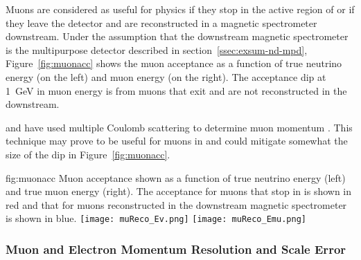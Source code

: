 \label{sec:muacc}

Muons are considered as useful for physics if they stop in the active region of  or if they leave the  detector and are reconstructed in a magnetic spectrometer downstream.  Under the assumption that the downstream magnetic spectrometer is the multipurpose detector described in section~\ref{ssec:exsum-nd-mpd}, Figure~\ref{fig:muonacc}  shows the muon acceptance as a function of true neutrino energy (on the left) and muon energy (on the right). The acceptance dip at \SI{1}{GeV} in muon energy is from muons that exit  and are not reconstructed in the  downstream.

 and  have used multiple Coulomb scattering to determine muon momentum \cite{Abratenko:2017nki}.  
This technique may prove to be useful for muons in  and could  mitigate somewhat the size of the dip in Figure~\ref{fig:muonacc}.   

\begin{dunefigure}{fig:muonacc}
{Muon acceptance shown as a function of true neutrino energy (left) and true muon energy (right).  The acceptance for muons that stop in  is shown in red and that for muons reconstructed in the downstream magnetic spectrometer is shown in blue.}
      \texttt{[image: muReco\_Ev.png]}
      \texttt{[image: muReco\_Emu.png]}
\end{dunefigure}

\subsubsection{Muon and Electron Momentum Resolution and Scale Error}


